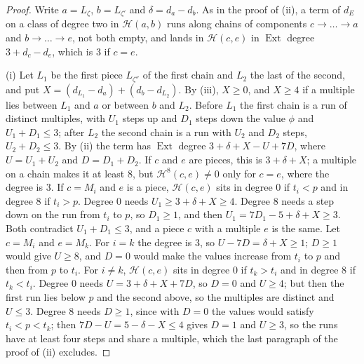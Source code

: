 \documentclass[11pt,reqno]{amsart}
\theoremstyle{plain}
\theoremstyle{definition}
\theoremstyle{remark}
\newcommand{\cH}{\mathcal{H}}
\DeclareMathOperator{\Ext}{Ext}
\begin{document}
\begin{proof}
Write $a=L_{\zeta}$, $b=L_{\zeta'}$ and $\delta=d_{a}-d_{b}$. As in the proof
of (ii), a term of $d_{E}$ on a class of degree two
in $\cH(a,b)$ runs along chains of components $c\to\dots\to a$ and
$b\to\dots\to e$, not both empty, and lands in $\cH(c,e)$ in $\Ext$ degree
$3+d_{c}-d_{e}$, which is $3$ if $c=e$.

(i) Let $L_{1}$ be the first piece $L_{\zeta''}$ of the first chain and
$L_{2}$ the last of the second, and put
$X=(d_{L_{1}}-d_{a})+(d_{b}-d_{L_{2}})$. By (iii),
$X\ge0$, and $X\ge4$ if a multiple lies between $L_{1}$ and $a$ or between
$b$ and $L_{2}$. Before $L_{1}$ the first chain is a run of distinct
multiples, with $U_{1}$ steps up and $D_{1}$ steps down the value $\phi$ and
$U_{1}+D_{1}\le3$; after $L_{2}$ the second chain is a run with $U_{2}$ and
$D_{2}$ steps, $U_{2}+D_{2}\le3$. By (ii) the term has
$\Ext$ degree $3+\delta+X-U+7D$, where $U=U_{1}+U_{2}$ and $D=D_{1}+D_{2}$.
If $c$ and $e$ are pieces, this is $3+\delta+X$; a multiple on a chain makes
it at least $8$, but $\cH^{8}(c,e)\ne0$ only for $c=e$, where the degree is
$3$. If $c=M_{i}$ and $e$ is a piece, $\cH(c,e)$ sits in degree $0$ if
$t_{i}<p$ and in degree $8$ if $t_{i}>p$. Degree $0$ needs
$U_{1}\ge3+\delta+X\ge4$. Degree $8$ needs a step down on the run from
$t_{i}$ to $p$, so $D_{1}\ge1$, and then
$U_{1}=7D_{1}-5+\delta+X\ge3$. Both contradict $U_{1}+D_{1}\le3$, and a
piece $c$ with a multiple $e$ is the same. Let $c=M_{i}$ and $e=M_{k}$. For
$i=k$ the degree is $3$, so $U-7D=\delta+X\ge1$; $D\ge1$ would give $U\ge8$,
and $D=0$ would make the values increase from $t_{i}$ to $p$ and then from
$p$ to $t_{i}$. For $i\ne k$, $\cH(c,e)$ sits in degree $0$ if $t_{k}>t_{i}$
and in degree $8$ if $t_{k}<t_{i}$. Degree $0$ needs $U=3+\delta+X+7D$, so
$D=0$ and $U\ge4$; but then the first run lies below $p$ and the second
above, so the multiples are distinct and $U\le3$. Degree $8$ needs $D\ge1$,
since with $D=0$ the values would satisfy $t_{i}<p<t_{k}$; then
$7D-U=5-\delta-X\le4$ gives $D=1$ and $U\ge3$, so the runs have at least
four steps and share a multiple, which the last paragraph of the proof of
(ii) excludes.


\end{proof}
\end{document}
